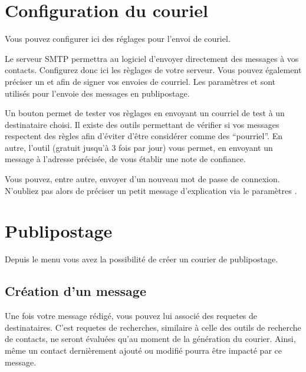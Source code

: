 \documentclass[a4paper,10pt,oneside,french]{sphinxmanual}
\begin{document}
\section{Configuration du couriel}
\label{\detokenize{mailing/configuration:configuration-du-couriel}}\label{\detokenize{mailing/configuration::doc}}
Vous pouvez configurer ici des réglages pour l’envoi de couriel.

Le serveur SMTP permettra au logiciel d’envoyer directement des messages à vos contacts.
Configurez donc ici les règlages de votre serveur.
Vous pouvez également préciser un  et  afin de signer vos envoies de courriel.
Les paramètres  et  sont utilisés pour l’envoie des messages en publipostage.

Un bouton  permet de tester vos règlages en envoyant un courriel de test à un destinataire choisi.
Il existe des outils permettant de vérifier si vos messages respectent des règles afin d’éviter d’être considérer comme des “pourriel”.
En autre, l’outil  (gratuit jusqu’à 3 fois par jour) vous permet, en envoyant un message à l’adresse précisée, de vous établir une note de confiance.

Vous pouvez, entre autre, envoyer d’un nouveau mot de passe de connexion.
N’oubliez pas alors de préciser un petit message d’explication via le paramètres .


\section{Publipostage}
\label{\detokenize{mailing/mailing:publipostage}}\label{\detokenize{mailing/mailing::doc}}
Depuis le menu  vous avez la possibilité de créer un courier de publipostage.


\subsection{Création d’un message}
\label{\detokenize{mailing/mailing:creation-d-un-message}}
Une fois votre message rédigé, vous pouvez lui associé des requetes de destinataires.
C’est requetes de recherches, similaire à celle des outils de recherche de contacts, ne seront évaluées qu’au moment de la génération du courier.
Ainsi, même un contact dernièrement ajouté ou modifié pourra être impacté par ce message.
\end{document}
